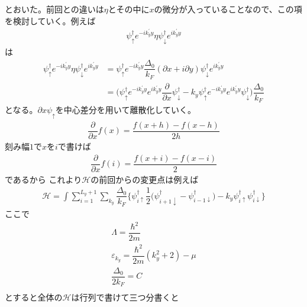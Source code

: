 \documentclass{jarticle}
\begin{document}
とおいた。前回との違いは$\eta$とその中に$x$の微分が入っていることなので、この項を検討していく。例えば
\begin{align}
\psi_{\uparrow}^{\dagger}e^{-ik_{y}^{'}y}\eta\psi_{\downarrow}^{\dagger}e^{ik_{y}^{'}y}
\end{align}
は
\begin{align}
\psi_{\uparrow}^{\dagger}e^{-ik_{y}^{'}y}\eta\psi_{\downarrow}^{\dagger}e^{ik_{y}^{'}y}&=　\psi_{\uparrow}^{\dagger}e^{-ik_{y}^{'}y}\dfrac{\Delta_0}{k_{F}}(\partial x+i\partial y)\psi_{\downarrow}^{\dagger}e^{ik_{y}^{'}y}\\
&=\bigl(\psi_{\uparrow}^{\dagger}e^{-ik_{y}^{'}y}e^{ik_{y}^{'}y}\dfrac{\partial}{\partial x}\psi_{\downarrow}^{\dagger}-k_{y}\psi_{\uparrow}^{\dagger}e^{-ik_{y}^{'}y}e^{ik_{y}^{'}y}\psi_{\downarrow}^{\dagger}\bigr)\dfrac{\Delta_0}{k_{F}}
\end{align}
となる。$\partial x\psi_{\uparrow}$を中心差分を用いて離散化していく。
\begin{align}
\dfrac{\partial}{\partial x}f(x)=\dfrac{f(x+h)-f(x-h)}{2h}
\end{align}
刻み幅$1$で$x$を$i$で書けば
\begin{align}
\dfrac{\partial}{\partial x}f(i)=\dfrac{f(x+i)-f(x-i)}{2}
\end{align}
であるから
これより$\mathcal{H}$の前回からの変更点は例えば
\begin{align}
\mathcal{H}
=\int\sum_{i=1}^{L_y+1}\displaystyle\sum_{k_y}\dfrac{\Delta_0}{k_{F}}\bigl\{\psi_{i\uparrow}^{\dagger}\dfrac{1}{2}\bigl(\psi_{i+1\downarrow}^{\dagger}-\psi_{i-1\downarrow}^{\dagger}\bigr)-k_{y}\psi_{i\uparrow}^{\dagger}\psi_{i\downarrow}^{\dagger}\bigr\}
\end{align}
ここで
\begin{align}
\Lambda=\dfrac{\hbar^2}{2m}\\
\varepsilon_{k_y}=\dfrac{\hbar^2}{2m}(k_y^2+2)-\mu\\
\dfrac{\Delta_0}{2k_{F}}=C\\
\end{align}
とすると全体の$\mathcal{H}$は行列で書けて三つ分書くと
\end{document}

